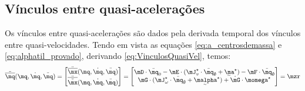 \documentclass[]{politex}
\begin{document}
\subsection{Vínculos entre quasi-acelerações} 
Os vínculos entre quasi-acelerações são dados pela derivada temporal dos vínculos entre quasi-velocidades. Tendo em vista as equações \eqref{eq:a_centrosdemassa} e \eqref{eq:alphatil_provado}, derivando \eqref{eq:VinculosQuasiVel}, temos:
\begin{equation} \label{eq:VinculosQuasiAce}
\ddot{\overline{\mq}}(\mq,\dot{\mq},\ddot{\mq}) =
\begin{bmatrix}
\ddot{\overline{\mx}}(\mq,\dot{\mq},\ddot{\mq}) \\
\ddot{\overline{\breve{\mx}}}(\mq,\dot{\mq},\ddot{\mq})
\end{bmatrix}
= 
\begin{bmatrix}
\mD \cdot \ddot{\mq}_0 - \mE \cdot (\mJ_v^\star \cdot \ddot{\mq}_\emptyset + \underaccent{\sim}{\ma}^\star)  - \mF \cdot \ddot{\mq}_\emptyset \\
\mG \cdot ( \mJ_\omega^\star \cdot \ddot{\mq}_\emptyset + \underaccent{\sim}{ \malpha }^\star ) + \dot{\mG} \cdot  \momega^\star
\end{bmatrix}
=
\mzr
\end{equation}
\end{document}
